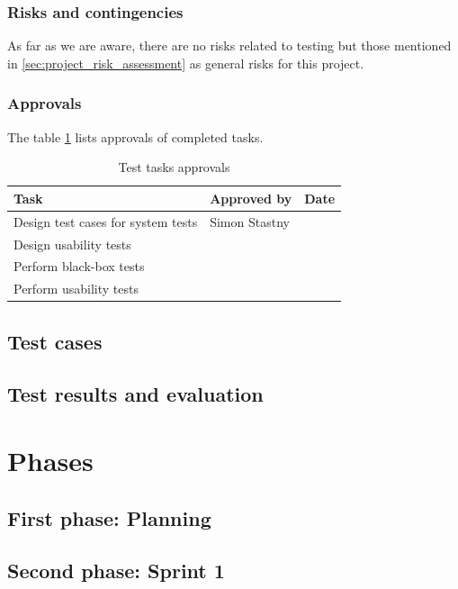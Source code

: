 \documentclass[11pt]{book}
\begin{document}
\subsection{Risks and contingencies}

As far as we are aware, there are no risks related to testing but those mentioned in \ref{sec:project_risk_assessment} as general risks for this project.

\subsection{Approvals}

The table \ref{tab:test_plan_approvals} lists approvals of completed tasks.

\begin{table}[H]
	\centering
	\begin{tabular}{| l | l | l |}
		\hline
		Task 								& Approved by 	& Date 	\\ \hline
		Design test cases for system tests 	& Simon Stastny & 		\\ \hline
		Design usability tests 				& 				& 		\\ \hline
		Perform black-box tests 			& 				& 		\\ \hline
		Perform usability tests 			& 				& 		\\ \hline
	\end{tabular}
	\label{tab:test_plan_approvals}
	\caption{Test tasks approvals}
\end{table}

\section{Test cases} \label{sec:test_cases}

\section{Test results and evaluation}

\chapter{Phases}
\section{First phase: Planning}

\section{Second phase: Sprint 1}
\end{document}
